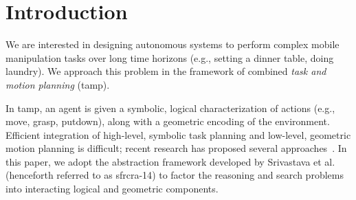 \section{Introduction}
We are interested in designing autonomous systems to perform complex
mobile manipulation tasks over long time horizons (e.g., setting a
dinner table, doing laundry). We approach this problem in the
framework of combined \emph{task and motion planning} ({\sc tamp}).

In {\sc tamp}, an agent is given a symbolic, logical characterization
of actions (e.g., move, grasp, putdown), along with a geometric
encoding of the environment.  Efficient integration of high-level,
symbolic task planning and low-level, geometric motion planning is
difficult; recent research has proposed several
approaches~\cite{srivastava2014combined, deardenplanningtamp,
  kaelbling2011hierarchical, lagriffoul2014orientation, GarrettWAFR14,
  dornhege2012semantic}.  In this paper, we adopt the abstraction
framework developed by Srivastava et al.~\cite{srivastava2014combined}
(henceforth referred to as {\sc sfrcra-14}) to factor the reasoning
and search problems into interacting logical and geometric components.

